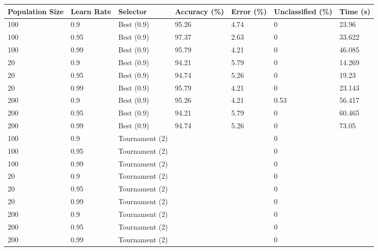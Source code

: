\documentclass[a4paper]{article}
\begin{document}
\begin{table}[h!]
  \centering
  \begin{tabular}{@{}lllllll@{}}
    \toprule
    Population Size & Learn Rate & Selector         & Accuracy (\%) & Error (\%) & Unclassified (\%) & Time (s) \\
    \midrule
    100             & 0.9        & Best (0.9)       & 95.26         & 4.74       & 0                 & 23.96    \\
    100             & 0.95       & Best (0.9)       & 97.37         & 2.63       & 0                 & 33.622   \\
    100             & 0.99       & Best (0.9)       & 95.79         & 4.21       & 0                 & 46.085   \\
    20              & 0.9        & Best (0.9)       & 94.21         & 5.79       & 0                 & 14.269   \\
    20              & 0.95       & Best (0.9)       & 94.74         & 5.26       & 0                 & 19.23    \\
    20              & 0.99       & Best (0.9)       & 95.79         & 4.21       & 0                 & 23.143   \\
    200             & 0.9        & Best (0.9)       & 95.26         & 4.21       & 0.53              & 56.417   \\
    200             & 0.95       & Best (0.9)       & 94.21         & 5.79       & 0                 & 60.465   \\
    200             & 0.99       & Best (0.9)       & 94.74         & 5.26       & 0                 & 73.05    \\

    100             & 0.9        & Tournament (2)   &          &        & 0                 &    \\
    100             & 0.95       & Tournament (2)   &          &        & 0                 &    \\
    100             & 0.99       & Tournament (2)   &          &        & 0                 &    \\
    20              & 0.9        & Tournament (2)   &          &        & 0                 &    \\
    20              & 0.95       & Tournament (2)   &          &        & 0                 &    \\
    20              & 0.99       & Tournament (2)   &          &        & 0                 &    \\
    200             & 0.9        & Tournament (2)   &          &        & 0                 &    \\
    200             & 0.95       & Tournament (2)   &          &        & 0                 &    \\
    200             & 0.99       & Tournament (2)   &          &        & 0                 &    \\


\end{tabular}
\end{table}
\end{document}
